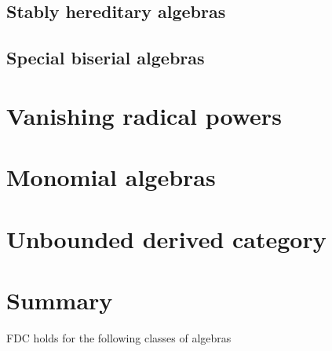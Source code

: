 \documentclass[11pt, a4paper, english]{article}
\theoremstyle{definition}
\begin{document}
\subsection{Stably hereditary algebras}


\subsection{Special biserial algebras}
\cite{EHIS04}

\section{Vanishing radical powers}


\section{Monomial algebras}\label{sec:monomial_algebras}


\section{Unbounded derived category}\label{sec:Unbounded_derived_category}


\section{Summary}

FDC holds for the following classes of algebras
\end{document}

